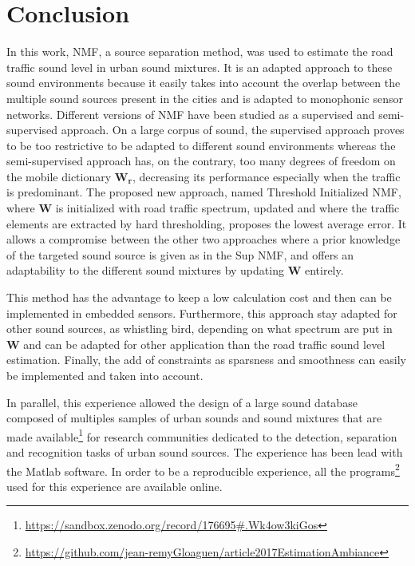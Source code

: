 \documentclass[twocolumn,a4paper,10pt]{article}
\begin{document}
\section{Conclusion}

In this work, NMF, a source separation method, was used to estimate the road traffic sound level in urban sound mixtures. It is an adapted approach to these sound environments because it easily takes into account the overlap between the multiple sound sources present in the cities and is adapted to monophonic sensor networks. Different versions of NMF have been studied as a supervised and semi-supervised approach. On a large corpus of sound, the supervised approach proves to be too restrictive to be adapted to different sound environments whereas the semi-supervised approach has, on the contrary, too many degrees of freedom on the mobile dictionary $\mathbf{W_r}$, decreasing its performance especially when the traffic is predominant. The proposed new approach, named Threshold Initialized NMF, where $\mathbf{W}$ is initialized with road traffic spectrum, updated and where the traffic elements are extracted by hard thresholding, proposes the lowest average error. It allows a compromise between the other two approaches where a prior knowledge of the targeted sound source is given as in the Sup NMF, and offers an adaptability to the different sound mixtures by updating $ \mathbf{W}$ entirely.

This method has the advantage to keep a low calculation cost and then can be implemented in embedded sensors. Furthermore, this approach stay adapted for other sound sources, as whistling bird, depending on what spectrum are put in $\mathbf{W}$ and can be adapted for other application than the road traffic sound level estimation. Finally, the add of constraints as sparsness \cite{hoyer2004non} and smoothness \cite{virtanen_monaural_2007} can easily be implemented and taken into account.

In parallel, this experience allowed the design of a large sound database composed of multiples samples of urban sounds and sound mixtures that are made available\footnote{\url{https://sandbox.zenodo.org/record/176695#.Wk4ow3kiGos}} for research communities dedicated to the detection, separation and recognition tasks of urban sound sources.
The experience has been lead with the Matlab software. In order to be a reproducible experience, all the programs\footnote{\url{https://github.com/jean-remyGloaguen/article2017EstimationAmbiance}} used for this experience are available online.

\footnotesize


\end{document}
